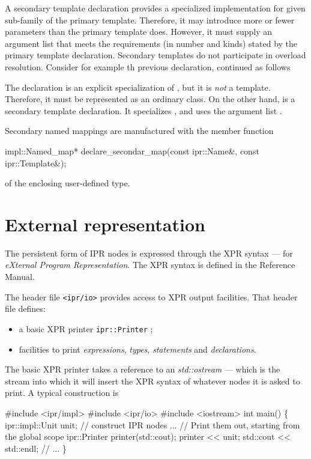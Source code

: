 \documentclass[11pt]{article}
\begin{document}
A secondary template declaration provides a specialized implementation for 
given sub-family of the primary template.  Therefore, it may introduce
more or fewer parameters than the primary template does.  However, it must
supply an argument list that meets the requirements (in number and kinds)
stated by the primary template declaration. Secondary templates do not
participate in overload resolution. Consider for example th previous
 declaration, continued as follows
The declaration  is an explicit specialization of
, but it is \emph{not} a template.  Therefore, it must be
represented as an ordinary class.  On the other hand,  is a
secondary template declaration.  It specializes , and uses the 
argument list .

Secondary named mappings are manufactured with the member function
\begin{Program}
  impl::Named_map* declare_secondar_map(const ipr::Name&, const ipr::Template&);
\end{Program}
of the enclosing user-defined type.

\section{External representation}
\label{sec:xpr}

The persistent form of IPR nodes is expressed through the 
XPR syntax --- for \emph{eXternal Program Representation}.  The XPR syntax is
defined in the Reference Manual.  

The header file \texttt{<ipr/io>} provides access to XPR output 
facilities.  That header file defines:
\begin{itemize}
\item a basic XPR printer \texttt{ipr::Printer} ;
\item facilities to print \emph{expressions}, \emph{types}, \emph{statements}
  and \emph{declarations}.  
\end{itemize}

The basic XPR printer takes a reference to an \emph{std::ostream} --- which is
the stream into which it will insert the XPR syntax of whatever nodes it is
asked to print.  A typical construction is 
\begin{Program}
  \#include <ipr/impl>
  \#include <ipr/io>
  \#include <iostream>
  int main() 
  \{
      ipr::impl::Unit unit;
      // construct IPR nodes ...
      // Print them out, starting from the global scope
      ipr::Printer printer(std::cout);
      printer << unit;
      std::cout << std::endl;
      // ...
  \}
\end{Program}



\end{document}

